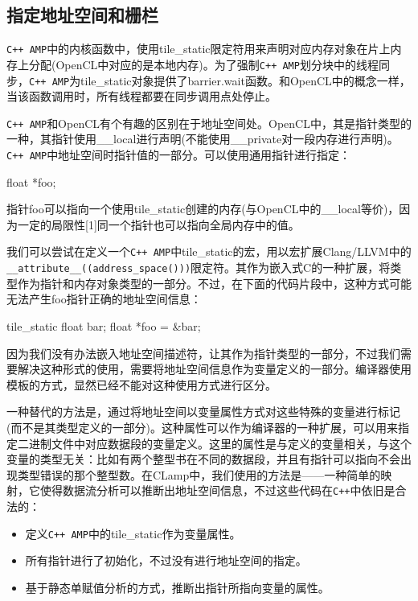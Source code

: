 \subsection{指定地址空间和栅栏}

\texttt{C++ AMP}中的内核函数中，使用tile\_\allowbreak{}static限定符用来声明对应内存对象在片上内存上分配(OpenCL中对应的是本地内存)。为了强制\texttt{C++ AMP}划分块中的线程同步，\texttt{C++ AMP}为tile\_\allowbreak{}static对象提供了barrier.wait函数。和OpenCL中的概念一样，当该函数调用时，所有线程都要在同步调用点处停止。

\texttt{C++ AMP}和OpenCL有个有趣的区别在于地址空间处。OpenCL中，其是指针类型的一种，其指针使用\_\allowbreak{}\_\allowbreak{}local进行声明(不能使用\_\allowbreak{}\_\allowbreak{}private对一段内存进行声明)。\texttt{C++ AMP}中地址空间时指针值的一部分。可以使用通用指针进行指定：

\begin{codebox}[cpp]
float *foo;
\end{codebox}

指针foo可以指向一个使用tile\_\allowbreak{}static创建的内存(与OpenCL中的\_\allowbreak{}\_\allowbreak{}local等价)，因为一定的局限性[1]同一个指针也可以指向全局内存中的值。

我们可以尝试在定义一个\texttt{C++ AMP}中tile\_\allowbreak{}static的宏，用以宏扩展Clang/LLVM中的\texttt{\_\_attribute\_\_((address\_space()))}限定符。其作为嵌入式C的一种扩展，将类型作为指针和内存对象类型的一部分。不过，在下面的代码片段中，这种方式可能无法产生foo指针正确的地址空间信息：

\begin{codebox}[cpp]
tile_static float bar;
float *foo = &bar;
\end{codebox}

因为我们没有办法嵌入地址空间描述符，让其作为指针类型的一部分，不过我们需要解决这种形式的使用，需要将地址空间信息作为变量定义的一部分。编译器使用模板的方式，显然已经不能对这种使用方式进行区分。

一种替代的方法是，通过将地址空间以变量属性方式对这些特殊的变量进行标记(而不是其类型定义的一部分)。这种属性可以作为编译器的一种扩展，可以用来指定二进制文件中对应数据段的变量定义。这里的属性是与定义的变量相关，与这个变量的类型无关：比如有两个整型书在不同的数据段，并且有指针可以指向不会出现类型错误的那个整型数。在CLamp中，我们使用的方法是——一种简单的映射，它使得数据流分析可以推断出地址空间信息，不过这些代码在\texttt{C++}中依旧是合法的：

\begin{itemize}
\item 定义\texttt{C++ AMP}中的tile\_\allowbreak{}static作为变量属性。
\item 所有指针进行了初始化，不过没有进行地址空间的指定。
\item 基于静态单赋值分析的方式，推断出指针所指向变量的属性。
\end{itemize}

